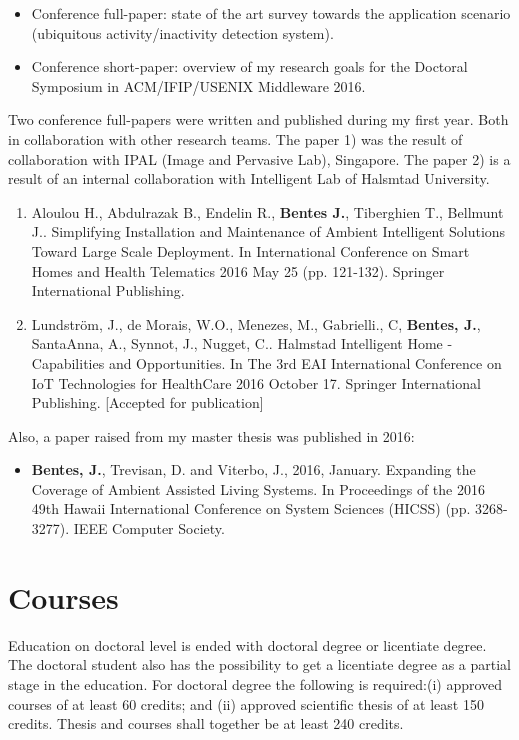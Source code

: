 \documentclass[]{report}
\begin{document}
\begin{itemize}
	\item Conference full-paper: state of the art survey towards the application scenario (ubiquitous activity/inactivity detection system).
	\item Conference short-paper: overview of my research goals for the Doctoral Symposium in ACM/IFIP/USENIX Middleware 2016.
\end{itemize}

\noindent Two conference full-papers were written and published during my first year. Both in collaboration with other research teams. The paper 1) was the result of collaboration with IPAL (Image and Pervasive Lab), Singapore. The paper 2) is a result of an internal collaboration with Intelligent Lab of Halsmtad University.

\begin{enumerate}
	\item Aloulou H., Abdulrazak B., Endelin R., \textbf{Bentes J.}, Tiberghien T., Bellmunt J.. Simplifying Installation and Maintenance of Ambient Intelligent Solutions Toward Large Scale Deployment. In International Conference on Smart Homes and Health Telematics 2016 May 25 (pp. 121-132). Springer International Publishing.
	\item Lundstr\"{o}m, J., de Morais, W.O., Menezes, M., Gabrielli., C, \textbf{Bentes, J.}, SantaAnna, A., Synnot, J., Nugget, C.. Halmstad Intelligent Home - Capabilities and Opportunities. In The 3rd EAI International Conference on IoT Technologies for HealthCare 2016 October 17. Springer International Publishing. [Accepted for publication]
\end{enumerate}

\noindent Also, a paper raised from my master thesis was published in 2016:

\begin{itemize}
	\item \textbf{Bentes, J.}, Trevisan, D. and Viterbo, J., 2016, January. Expanding the Coverage of Ambient Assisted Living Systems. In Proceedings of the 2016 49th Hawaii International Conference on System Sciences (HICSS) (pp. 3268-3277). IEEE Computer Society. 
\end{itemize}

\section*{Courses}

Education on doctoral level is ended with doctoral degree or licentiate degree. The doctoral student also has the possibility to get a licentiate degree as a partial stage in the education. For doctoral degree the following is required:(i) approved courses of at least 60 credits; and (ii) approved scientific thesis of at least 150 credits. Thesis and courses shall together be at least 240 credits.
\end{document}
